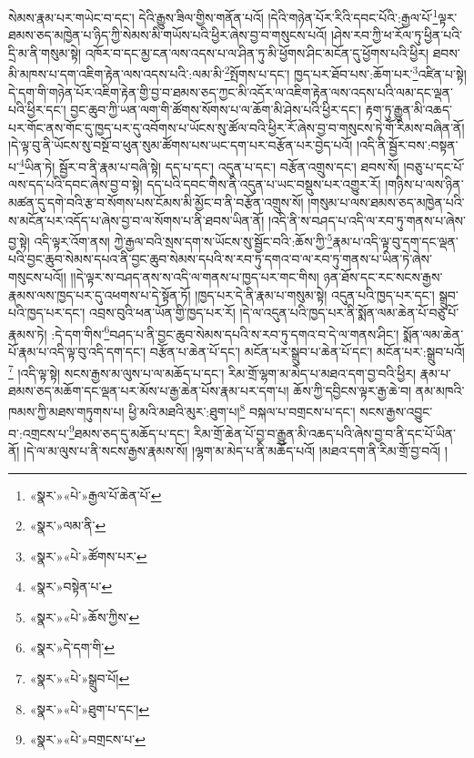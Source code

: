 སེམས་རྣམ་པར་གཡེང་བ་དང་། དེའི་རྒྱུས་ཟིལ་གྱིས་གནོན་པའོ། །དེའི་གཉེན་པོར་རིའི་དབང་པོའི་:རྒྱལ་པོ་\footnote{«སྣར་»«པེ་»རྒྱལ་པོ་ཆེན་པོ་}ལྟར་ཐམས་ཅད་མཁྱེན་པ་ཉིད་ཀྱི་སེམས་མི་གཡོས་པའི་ཕྱིར་ཞེས་བྱ་བ་གསུངས་པའོ། །ཤེས་རབ་ཀྱི་ཕ་རོལ་ཏུ་ཕྱིན་པའི་དྲི་མ་ནི་གསུམ་སྟེ། འཁོར་བ་དང་མྱ་ངན་ལས་འདས་པ་ལ་ཤིན་ཏུ་མི་ཕྱོགས་ཤིང་མངོན་དུ་ཕྱོགས་པའི་ཕྱིར། ཐབས་མི་མཁས་པ་དག་འཇིག་རྟེན་ལས་འདས་པའི་:ལམ་མི་\footnote{«སྣར་»ལམ་ནི་}སྤོགས་པ་དང་། ཁྱད་པར་ཐོབ་པས་:ཆོག་པར་\footnote{«སྣར་»«པེ་»ཚོགས་པར་}འཛིན་པ་སྟེ། དེ་དག་གི་གཉེན་པོར་འཇིག་རྟེན་གྱི་བྱ་བ་ཐམས་ཅད་ཀྱང་མི་འདོར་ལ་འཇིག་རྟེན་ལས་འདས་པའི་ལམ་དང་ལྡན་པའི་ཕྱིར་དང་། བྱང་ཆུབ་ཀྱི་ཡན་ལག་གི་ཚོགས་སོགས་པ་ལ་ཆོག་མི་ཤེས་པའི་ཕྱིར་དང་། རྟག་ཏུ་རྒྱུན་མི་འཆད་པར་གོང་ནས་གོང་དུ་ཁྱད་པར་དུ་འབོགས་པ་ཡོངས་སུ་ཚོལ་བའི་ཕྱིར་རོ་ཞེས་བྱ་བ་གསུངས་ཏེ་གོ་རིམས་བཞིན་ནོ། །དེ་ལྟ་བུ་ནི་ཡོངས་སུ་བསྔོ་བ་ཕུན་སུམ་ཚོགས་པས་ཡང་དག་པར་བརྩོན་པར་བྱེད་པའོ། །འདི་ནི་སྦྱོར་བས་:བསྟན་པ་\footnote{«སྣར་»བསྟེན་པ་}ཡིན་ཏེ། སྦྱོར་བ་ནི་རྣམ་པ་བཞི་སྟེ། དད་པ་དང་། འདུན་པ་དང་། བརྩོན་འགྲུས་དང་། ཐབས་སོ། །བཅུ་པ་དང་པོ་ལས་དད་པའི་དབང་ཞེས་བྱ་བ་སྟེ། དད་པའི་དབང་གིས་ནི་འདུན་པ་ཡང་བསྡུས་པར་འགྱུར་རོ། །གཉིས་པ་ལས་ཉིན་མཚན་དུ་དགེ་བའི་རྩ་བ་སོགས་པས་ངོམས་མི་མྱོང་བ་ནི་བརྩོན་འགྲུས་སོ། །གསུམ་པ་ལས་ཐམས་ཅད་མཁྱེན་པའི་ས་མངོན་པར་འདོད་པ་ཞེས་བྱ་བ་ལ་སོགས་པ་ནི་ཐབས་ཡིན་ནོ། །འདི་ནི་ས་བཤད་པ་འདི་ལ་རབ་ཏུ་གནས་པ་ཞེས་བྱ་སྟེ། འདི་ལྟར་འོག་ནས། ཀྱེ་རྒྱལ་བའི་སྲས་དག་ས་ཡོངས་སུ་སྦྱོང་བའི་:ཆོས་ཀྱི་\footnote{«སྣར་»«པེ་»ཆོས་ཀྱིས་}རྣམ་པ་འདི་ལྟ་བུ་དག་དང་ལྡན་པའི་བྱང་ཆུབ་སེམས་དཔའ་ནི་བྱང་ཆུབ་སེམས་དཔའི་ས་རབ་ཏུ་དགའ་བ་ལ་རབ་ཏུ་གནས་པ་ཡིན་ཏེ་ཞེས་གསུངས་པའོ།། །།དེ་ལྟར་ས་བཤད་ནས་ས་འདི་ལ་གནས་པ་ཁྱད་པར་གང་གིས། ཉན་ཐོས་དང་རང་སངས་རྒྱས་རྣམས་ལས་ཁྱད་པར་དུ་འཕགས་པ་དེ་སྟོན་ཏོ། །ཁྱད་པར་དེ་ནི་རྣམ་པ་གསུམ་སྟེ། འདུན་པའི་ཁྱད་པར་དང་། སྒྲུབ་པའི་ཁྱད་པར་དང་། འབྲས་བུའི་ཕན་ཡོན་གྱི་ཁྱད་པར་རོ། །དེ་ལ་འདུན་པའི་ཁྱད་པར་ནི་སྨོན་ལམ་ཆེན་པོ་བཅུ་པོ་རྣམས་ཏེ། :དེ་དག་གིས་\footnote{«སྣར་»དེ་དག་གི་}བཤད་པ་ནི་བྱང་ཆུབ་སེམས་དཔའི་ས་རབ་ཏུ་དགའ་བ་དེ་ལ་གནས་ཤིང་། སྨོན་ལམ་ཆེན་པོ་རྣམ་པ་འདི་ལྟ་བུ་འདི་དག་དང་། བརྩོན་པ་ཆེན་པོ་དང་། མངོན་པར་སྒྲུབ་པ་ཆེན་པོ་དང་། མངོན་པར་:སྒྲུབ་པའོ།\footnote{«སྣར་»«པེ་»སྒྲུབ་པོ།} །འདི་ལྟ་སྟེ། སངས་རྒྱས་མ་ལུས་པ་ལ་མཆོད་པ་དང་། རིམ་གྲོ་ལྷག་མ་མེད་པ་མཐའ་དག་བྱ་བའི་ཕྱིར། རྣམ་པ་ཐམས་ཅད་མཆོག་དང་ལྡན་པར་མོས་པ་རྒྱ་ཆེན་པོས་རྣམ་པར་དག་པ། ཆོས་ཀྱི་དབྱིངས་ལྟར་རྒྱ་ཆེ་བ། ནམ་མཁའི་ཁམས་ཀྱི་མཐས་གཏུགས་པ། ཕྱི་མའི་མཐའི་མུར་:ཐུག་པ།\footnote{«སྣར་»«པེ་»ཐུག་པ་དང་།} བསྐལ་པ་བགྲངས་པ་དང་། སངས་རྒྱས་འབྱུང་བ་:འགྲངས་པ་\footnote{«སྣར་»«པེ་»བགྲངས་པ་}ཐམས་ཅད་དུ་མཆོད་པ་དང་། རིམ་གྲོ་ཆེན་པོ་བྱ་བ་རྒྱུན་མི་འཆད་པའི་ཞེས་བྱ་བ་ནི་དང་པོ་ཡིན་ནོ། །དེ་ལ་མ་ལུས་པ་ནི་སངས་རྒྱས་རྣམས་སོ། །ལྷག་མ་མེད་པ་ནི་མཆོད་པའོ། །མཐའ་དག་ནི་རིམ་གྲོ་བྱ་བའོ། །
